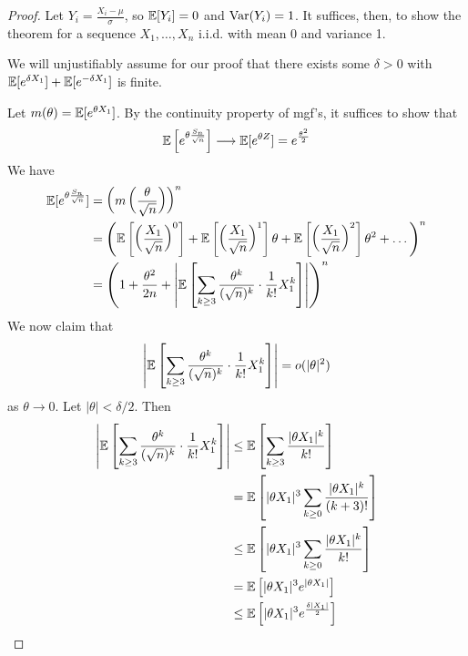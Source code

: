 \documentclass{../../template/note}
\begin{document}
    \begin{proof}
        Let \(Y_i = \frac{X_i-\mu}{\sigma}\), so \(\mathbb E[Y_i] = 0\) and \(\operatorname{Var}(Y_i) = 1\). It suffices, then, to show the theorem for a sequence \(X_1, \dots, X_n\) i.i.d. with mean 0 and variance 1.

        We will unjustifiably assume for our proof that there exists some \(\delta > 0\) with \(\mathbb E[e^{\delta X_1}] + \mathbb E[e^{-\delta X_1}]\) is finite.

        Let \(m(\theta) = \mathbb E[e^{\theta X_1}]\). By the continuity property of mgf's, it suffices to show that
        \begin{align*}
            \mathbb E\left[e^{\theta \frac{S_n}{\sqrt n}}\right] \longrightarrow \mathbb E[e^{\theta Z}] = e^{\frac{\theta^2}{2}}
        \end{align*}
        We have
        \begin{align*}
            \mathbb E[e^{\theta \frac{S_n}{\sqrt n}}] &= \left(m\left(\frac{\theta}{\sqrt n}\right)\right)^n \\
            &= \left(\mathbb E\left[\left(\frac{X_1}{\sqrt n}\right)^0\right] + \mathbb E\left[\left(\frac{X_1}{\sqrt n}\right)^1\right]\theta + \mathbb E\left[\left(\frac{X_1}{\sqrt n}\right)^2\right]\theta^2 + \dots\right)^n \\
            &= \left(1 + \frac{\theta^2}{2n} + \left|\mathbb E\left[\sum_{k \geq 3} \frac{\theta^k}{(\sqrt n)^k} \cdot \frac 1{k!} X_1^k\right]\right|\right)^n
        \end{align*}
        We now claim that
        \begin{align*}
            \left|\mathbb E\left[\sum_{k \geq 3} \frac{\theta^k}{(\sqrt n)^k} \cdot \frac 1{k!} X_1^k\right]\right| = o(|\theta|^2)
        \end{align*}
        as \(\theta \to 0\). Let \(|\theta| < \delta/2\). Then
        \begin{align*}
            \left|\EE\left[\sum_{k \geq 3} \frac{\theta^k}{(\sqrt n)^k} \cdot \frac 1{k!} X_1^k\right]\right| &\leq \EE\left[\sum_{k \geq 3} \frac{|\theta X_1|^k}{k!}\right] \\
            &= \EE\left[|\theta X_1|^3 \sum_{k \geq 0} \frac{|\theta X_1|^k}{(k+3)!}\right] \\
            &\leq \EE\left[|\theta X_1|^3 \sum_{k \geq 0} \frac{|\theta X_1|^k}{k!}\right] \\
            &= \EE\left[|\theta X_1|^3 e^{|\theta X_1|}\right] \\
            &\leq \EE\left[|\theta X_1|^3 e^{\frac{\delta|X_1|}{2}}\right]

\end{align*}
\end{proof}
\end{document}
